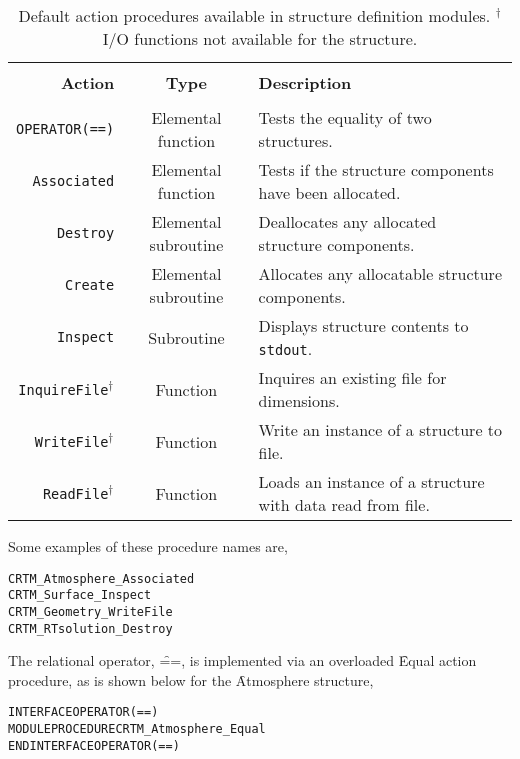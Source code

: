 \begin{table}[htp]
  \centering
  \caption{Default action procedures available in structure definition modules. $^{\dagger}$ I/O functions not available for the \ChannelInfo{} structure.}
  \begin{tabular}{r c l}
    \hline\\[-0.1cm]
    \sffamily\textbf{Action} & \sffamily\textbf{Type} & \sffamily\textbf{Description} \\
    \hline\hline\\[-0.2cm]
    \texttt{OPERATOR(==)}             & Elemental function   & Tests the equality of two structures. \\
    \texttt{Associated}               & Elemental function   & Tests if the structure components have been allocated. \\
    \texttt{Destroy}                  & Elemental subroutine & Deallocates any allocated structure components. \\
    \texttt{Create}                   & Elemental subroutine & Allocates any allocatable structure components. \\
    \texttt{Inspect}                  & Subroutine           & Displays structure contents to \texttt{stdout}. \\
    \texttt{InquireFile}$^{\dagger}$  & Function             & Inquires an existing file for dimensions. \\
    \texttt{WriteFile}$^{\dagger}$    & Function             & Write an instance of a structure to file. \\
    \texttt{ReadFile}$^{\dagger}$     & Function             & Loads an instance of a structure with data read from file. \\
  \hline
  \end{tabular}
  \label{tab:definition_module_default_procedures}
\end{table}

Some examples of these procedure names are,

\begin{alltt}
  CRTM_Atmosphere_Associated
  CRTM_Surface_Inspect
  CRTM_Geometry_WriteFile
  CRTM_RTsolution_Destroy\end{alltt}

The relational operator, \f{==}, is implemented via an overloaded \f{Equal} action procedure, as is shown below for the \f{Atmosphere} structure,

\begin{alltt}
  INTERFACE OPERATOR(==)
    MODULE PROCEDURE CRTM_Atmosphere_Equal
  END INTERFACE OPERATOR(==)\end{alltt}

